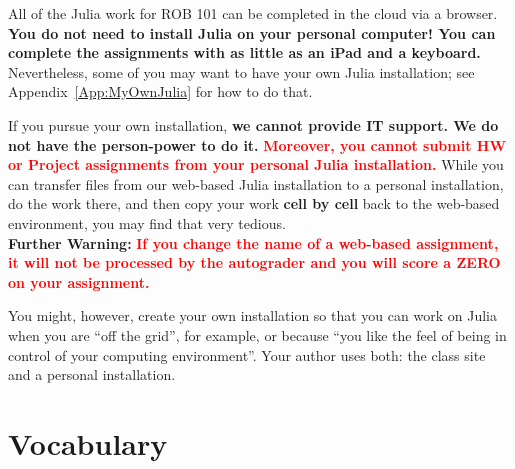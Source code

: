 All of the Julia work for ROB 101 can be completed in the cloud via a browser. \textbf{You do not need to install Julia on your personal computer! You can complete the assignments with as little as an iPad and a keyboard.} Nevertheless, some of you may want to have your own Julia installation; see  Appendix~\ref{App:MyOwnJulia} for how to do that.
\begin{tcolorbox}[sharp corners, colback=red!30, colframe=yellow!80!red, title=\textbf{\large Warning}]
 If you pursue your own installation, \textbf{we cannot provide IT support. We do not have the person-power to do it.} \textcolor{red}{\bf Moreover, you cannot submit HW or Project assignments from your personal Julia installation.} While you can transfer files from our web-based Julia installation to a  personal installation, do the work there, and then copy your work \textbf{cell by cell} back to the web-based environment, you may find that very tedious. \\

 \textbf{Further Warning:} \textcolor{red}{\bf If you change the name of a web-based assignment, it will not be processed by the autograder and you will score a ZERO on your assignment.}
\end{tcolorbox}
You might, however, create your own installation so that you can work on Julia when you are ``off the grid'', for example, or because ``you like the feel of being in control of your computing environment''. Your author uses both: the class site and a personal installation. 



\section{Vocabulary}

